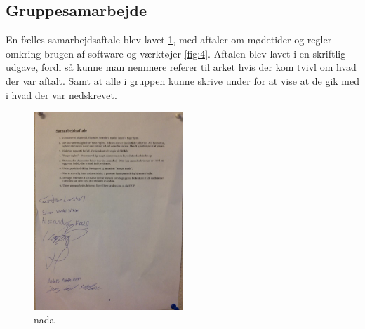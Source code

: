 \subsection{Gruppesamarbejde}
En fælles samarbejdsaftale blev lavet \cref{fig:SAftale}, med aftaler om mødetider og regler omkring brugen af software og værktøjer \cref{fig:4}. Aftalen blev lavet i en skriftlig udgave, fordi så kunne man nemmere referer til arket hvis der kom tvivl om hvad der var aftalt. Samt at alle i gruppen kunne skrive under for at vise at de gik med i hvad der var nedskrevet.

\begin{figure}[ht!]
  \centering
  \includegraphics[width=0.5\textwidth]{Images/S_Aftale.jpg}
  \caption{nada}
  \label{fig:SAftale}
\end{figure}

